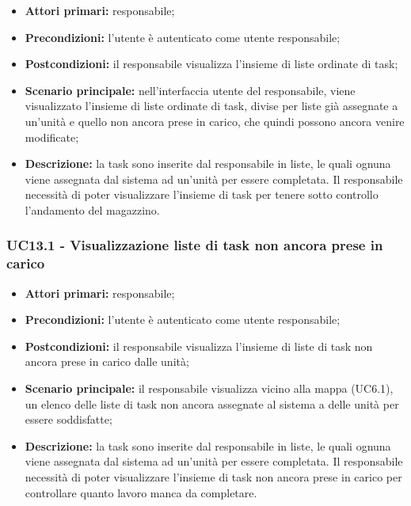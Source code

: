 \begin{itemize}
	\item 	\textbf{Attori primari:} responsabile;
	\item 	\textbf{Precondizioni:} l'utente è autenticato come utente responsabile;
	\item 	\textbf{Postcondizioni:} il responsabile visualizza l'insieme di liste ordinate di task;
	\item 	\textbf{Scenario principale:} nell'interfaccia utente del responsabile, viene visualizzato l'insieme di liste ordinate di task, divise per liste già assegnate a un'unità e quello non ancora prese in carico, che quindi possono ancora venire modificate;
	\item 	\textbf{Descrizione:} la task sono inserite dal responsabile in liste, le quali ognuna viene assegnata dal sistema ad un'unità per essere completata. Il responsabile necessità di poter visualizzare l'insieme di task per tenere sotto controllo l'andamento del magazzino.

\end{itemize}

\subsubsection{UC13.1 - Visualizzazione liste di task non ancora prese in carico}
\begin{itemize}
	\item 	\textbf{Attori primari:} responsabile;
	\item 	\textbf{Precondizioni:} l'utente è autenticato come utente responsabile;
	\item 	\textbf{Postcondizioni:} il responsabile visualizza l'insieme di liste di task non ancora prese in carico dalle unità;
	\item 	\textbf{Scenario principale:} il responsabile visualizza vicino alla mappa (UC6.1), un elenco delle liste di task non ancora assegnate al sistema a delle unità per essere soddisfatte;
	\item 	\textbf{Descrizione:} la task sono inserite dal responsabile in liste, le quali ognuna viene assegnata dal sistema ad un'unità per essere completata. Il responsabile necessità di poter visualizzare l'insieme di task non ancora prese in carico per controllare quanto lavoro manca da completare.


\end{itemize}

